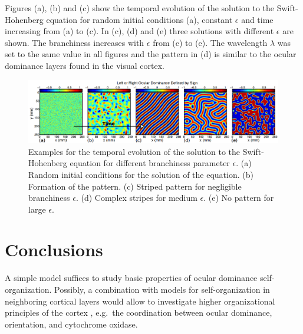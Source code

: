 \documentclass[twocolumn]{bmcart}%
\begin{document}
Figures (a), (b) and (c) show the temporal evolution of the solution to
the Swift-Hohenberg equation for random initial conditions (a), constant
\(\epsilon\) and time increasing from (a) to (c). In (c), (d) and (e)
three solutions with different \(\epsilon\) are shown. The branchiness
increases with \(\epsilon\) from (c) to (e). The wavelength \(\lambda\)
was set to the same value in all figures and the pattern in (d) is
similar to the ocular dominance layers found in the visual cortex.

\begin{figure}[h!]
  \includegraphics[width=.98\textwidth]{ocular_dominace.png}
  \caption{\label{centfig} Examples for the temporal evolution of the 
           solution to the Swift-Hohenberg equation for different 
           branchiness parameter \(\epsilon\).  (a) Random initial 
           conditions for the solution of the equation. (b) Formation of 
           the pattern. (c) Striped pattern for negligible branchiness 
           \(\epsilon\). (d) Complex stripes for medium \(\epsilon\). (e)
           No pattern for large \(\epsilon\).}
\end{figure}

\section{Conclusions}\label{conclusions}

A simple model suffices to study basic properties of ocular dominance
self-organization. Possibly, a combination with models for
self-organization in neighboring cortical layers would allow to
investigate higher organizational principles of the cortex
\cite{Reichl2012}, e.g.~the coordination between ocular dominance,
orientation, and cytochrome oxidase.

\end{document}
